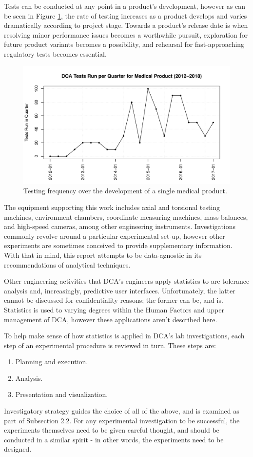 \documentclass[11pt,a4paper,article]{memoir} %
\begin{document}
Tests can be conducted at any point in a product's development, however as can be seen in Figure \ref{fig:tests_per_quarter}, the rate of testing increases as a product develops and varies dramatically according to project stage. Towards a product's release date is when resolving minor performance issues becomes a worthwhile pursuit, exploration for future product variants becomes a possibility, and rehearsal for fast-approaching regulatory tests becomes essential.
\begin{figure}
\includegraphics[width=\textwidth]{tests_per_quarter.pdf}
\caption{Testing frequency over the development of a single medical product.}
\label{fig:tests_per_quarter}
\end{figure}
\par
The equipment supporting this work includes axial and torsional testing machines, environment chambers, coordinate measuring machines, mass balances, and high-speed cameras, among other engineering instruments. Investigations commonly revolve around a particular experimental set-up, however other experiments are sometimes conceived to provide supplementary information. With that in mind, this report attempts to be data-agnostic in its recommendations of analytical techniques.
\par
Other engineering activities that DCA's engineers apply statistics to are tolerance analysis and, increasingly, predictive user interfaces. Unfortunately, the latter cannot be discussed for confidentiality reasons; the former can be, and is. Statistics is used to varying degrees within the Human Factors and upper management of DCA, however these applications aren't described here.
\par
To help make sense of how statistics is applied in DCA's lab investigations, each step of an experimental procedure is reviewed in turn. These steps are:
\begin{enumerate}
\item Planning and execution.
\item Analysis.
\item Presentation and visualization.
\end{enumerate}
Investigatory strategy guides the choice of all of the above, and is examined as part of Subsection 2.2. For any experimental investigation to be successful, the experiments themselves need to be given careful thought, and should be conducted in a similar spirit - in other words, the experiments need to be designed.
\end{document}
